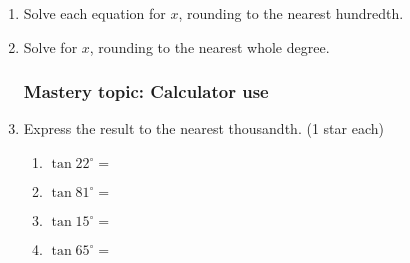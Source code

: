 \documentclass[12pt, twoside]{article}
\begin{document}
\begin{enumerate}
  \subsubsection*{Mastery topic: Algebraic solution \hfill (2 stars each)}
  \item Solve each equation for $x$, rounding to the nearest hundredth.
    \begin{enumerate}
  \end{enumerate}
    \vspace{6cm}
  \item Solve for $x$, rounding to the nearest whole degree.
    \begin{enumerate}
  \end{enumerate}
  
  \newpage
  \subsubsection*{Mastery topic: Calculator use}
    \item Express the result to the nearest thousandth. \hfill (1 star each) \vspace{.5cm}
      \begin{multicols}{2}
        \begin{enumerate}
          \item $\tan 22^\circ = $ \vspace{1cm}
          \item $\tan 81^\circ =$
          \item $\tan 15^\circ = $ \vspace{1cm}
          \item $\tan 65^\circ =$
        \end{enumerate}
      \end{multicols} \vspace{1cm}
  

\end{enumerate}
\end{document}
